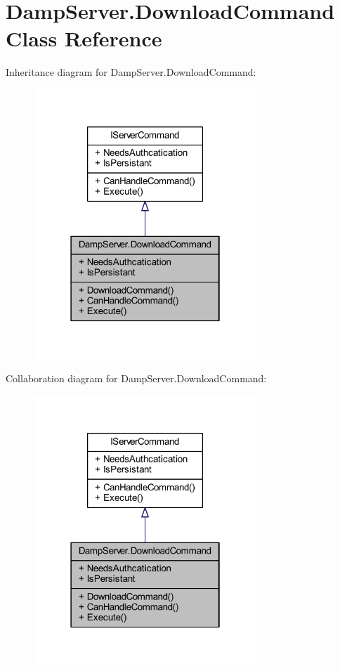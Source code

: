 \hypertarget{class_damp_server_1_1_download_command}{\section{Damp\-Server.\-Download\-Command Class Reference}
\label{class_damp_server_1_1_download_command}
}


Inheritance diagram for Damp\-Server.\-Download\-Command\-:\nopagebreak
\begin{figure}[H]
\begin{center}
\leavevmode
\includegraphics[width=238pt]{class_damp_server_1_1_download_command__inherit__graph}
\end{center}
\end{figure}


Collaboration diagram for Damp\-Server.\-Download\-Command\-:\nopagebreak
\begin{figure}[H]
\begin{center}
\leavevmode
\includegraphics[width=238pt]{class_damp_server_1_1_download_command__coll__graph}
\end{center}
\end{figure}
